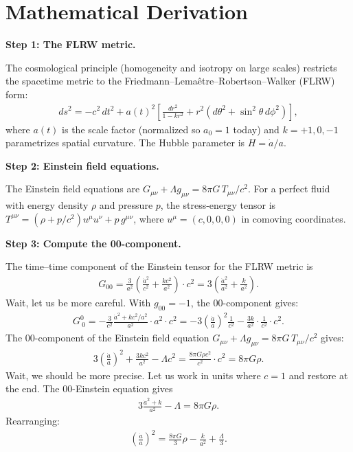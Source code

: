 \section*{Mathematical Derivation}

\textbf{Step 1: The FLRW metric.}

The cosmological principle (homogeneity and isotropy on large scales) restricts the spacetime metric to the Friedmann--Lema\^etre--Robertson--Walker (FLRW) form:
\begin{align}
ds^2 = -c^2\,dt^2 + a(t)^2\left[\frac{dr^2}{1 - kr^2} + r^2(d\theta^2 + \sin^2\theta\,d\phi^2)\right],
\end{align}
where $a(t)$ is the scale factor (normalized so $a_0 = 1$ today) and $k = +1, 0, -1$ parametrizes spatial curvature. The Hubble parameter is $H = \dot{a}/a$.

\textbf{Step 2: Einstein field equations.}

The Einstein field equations are $G_{\mu\nu} + \Lambda g_{\mu\nu} = 8\pi G\,T_{\mu\nu}/c^2$. For a perfect fluid with energy density $\rho$ and pressure $p$, the stress-energy tensor is $T^{\mu\nu} = (\rho + p/c^2)u^\mu u^\nu + p\,g^{\mu\nu}$, where $u^\mu = (c, 0, 0, 0)$ in comoving coordinates.

\textbf{Step 3: Compute the 00-component.}

The time--time component of the Einstein tensor for the FLRW metric is
\begin{align}
G_{00} = \frac{3}{a^2}\left(\frac{\dot{a}^2}{c^2} + \frac{kc^2}{a^2}\right) \cdot c^2 = 3\left(\frac{\dot{a}^2}{a^2} + \frac{k}{a^2}\right).
\end{align}
Wait, let us be more careful. With $g_{00} = -1$, the 00-component gives:
\begin{align}
G^0_{\ 0} = -\frac{3}{c^2}\frac{\dot{a}^2 + kc^2/a^2}{a^2}\cdot a^2 \cdot c^2 = -3\left(\frac{\dot{a}}{a}\right)^2\frac{1}{c^2} - \frac{3k}{a^2}\cdot\frac{1}{c^2}\cdot c^2.
\end{align}
The $00$-component of the Einstein field equation $G_{\mu\nu} + \Lambda g_{\mu\nu} = 8\pi G\,T_{\mu\nu}/c^2$ gives:
\begin{align}
3\left(\frac{\dot{a}}{a}\right)^2 + \frac{3kc^2}{a^2} - \Lambda c^2 = \frac{8\pi G\rho c^2}{c^2} \cdot c^2 = 8\pi G\rho.
\end{align}
Wait, we should be more precise. Let us work in units where $c = 1$ and restore at the end. The 00-Einstein equation gives
\begin{align}
3\frac{\dot{a}^2 + k}{a^2} - \Lambda = 8\pi G\rho.
\end{align}
Rearranging:
\begin{align}
\left(\frac{\dot{a}}{a}\right)^2 = \frac{8\pi G}{3}\rho - \frac{k}{a^2} + \frac{\Lambda}{3}.
\end{align}

